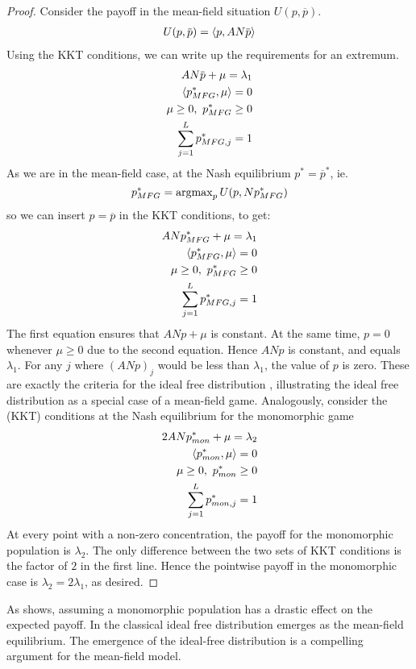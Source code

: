 \begin{proof}
Consider the payoff in the mean-field situation $U(p,\overbar{p})$.
\begin{align}
  U(p, \overbar{p}) = \ip{p}{AN \overbar{p}}
\end{align}
Using the KKT conditions, we can write up the requirements for an extremum.
\begin{equation}
  \begin{split}
    AN \overbar{p} + \mu = \lambda_1 \\
    \ip{p^*_{MFG}}{\mu} = 0 \\
    \mu \geq 0,~p^*_{MFG} \geq 0 \\
    \sum_{j=1}^L p^*_{MFG,j} = 1
  \end{split}
\end{equation}
As we are in the mean-field case, at the Nash equilibrium $p^* = \overbar{p}^*$, ie.
\begin{equation}
  p^*_{MFG} = \operatorname{argmax}_{p} U(p,N p^*_{MFG})
\end{equation}
so we can insert $p=\overbar{p}$ in the KKT conditions, to get:
\begin{equation}
  \begin{split}
    AN p_{MFG}^* + \mu =  \lambda_1 \\
    \left \langle p^*_{MFG},\mu \right \rangle = 0 \\
    \mu \geq 0,~p^*_{MFG} \geq 0 \\
    \sum_{j=1}^L p^*_{MFG,j} = 1
  \end{split}
\end{equation}
The first equation ensures that $AN p + \mu$ is constant. At the same time, $p=0$ whenever $\mu \geq 0$ due to the second equation. Hence $AN p$ is constant, and equals $\lambda_1$. For any $j$ where $(ANp)_j$ would be less than $\lambda_1$, the value of $p$ is zero.
These are exactly the criteria for the ideal free distribution \citep{fretwell1969territorial}, illustrating the ideal free distribution as a special case of a mean-field game.
Analogously, consider the (KKT) conditions at the Nash equilibrium for the monomorphic game
\begin{equation}
  \begin{split}
    2ANp^*_{mon} + \mu = \lambda_2  \\
    \left \langle p^*_{mon},\mu \right \rangle = 0 \\
    \mu \geq 0,~p_{mon}^* \geq 0 \\
    \sum_{j=1}^L p^*_{mon,j} = 1
  \end{split}
\end{equation}
At every point with a non-zero concentration, the payoff for the monomorphic population is $\lambda_2$. The only difference between the two sets of KKT conditions is the factor of $2$ in the first line. Hence the pointwise payoff in the monomorphic case is $\lambda_2 = 2\lambda_1$, as desired.
\end{proof}

As  shows, assuming a monomorphic population has a drastic effect on the expected payoff. In  the classical ideal free distribution emerges as the mean-field equilibrium. The emergence of the ideal-free distribution is a compelling argument for the mean-field model.
